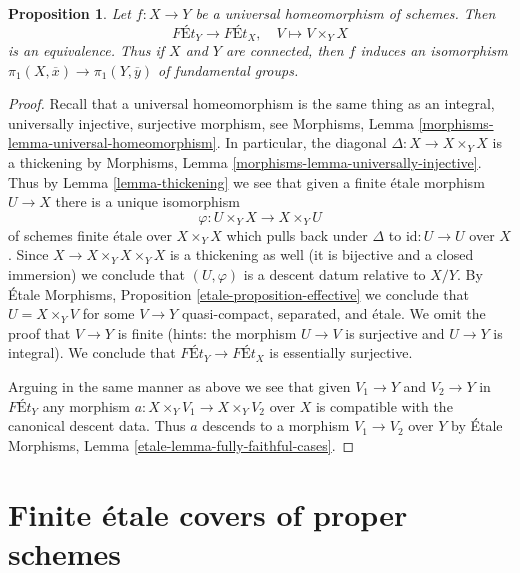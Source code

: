 \documentclass{stacks-project}
\theoremstyle{plain}
\newtheorem{proposition}[subsection]{Proposition}
\theoremstyle{definition}
\theoremstyle{remark}
\numberwithin{equation}{subsection}
\begin{document}
\begin{proposition}
\label{proposition-universal-homeomorphism}
Let $f : X \to Y$ be a universal homeomorphism of schemes. Then
$$
\textit{F\'Et}_Y \longrightarrow \textit{F\'Et}_X,\quad
V \longmapsto V \times_Y X
$$
is an equivalence. Thus if $X$ and $Y$ are connected, then
$f$ induces an isomorphism $\pi_1(X, \overline{x}) \to \pi_1(Y, \overline{y})$
of fundamental groups.
\end{proposition}

\begin{proof}
Recall that a universal homeomorphism is the same thing as an
integral, universally injective, surjective morphism, see
Morphisms, Lemma \ref{morphisms-lemma-universal-homeomorphism}.
In particular, the diagonal $\Delta : X \to X \times_Y X$ is a thickening
by Morphisms, Lemma \ref{morphisms-lemma-universally-injective}.
Thus by Lemma \ref{lemma-thickening}
we see that given a finite \'etale morphism $U \to X$
there is a unique isomorphism
$$
\varphi : U \times_Y X \to X \times_Y U
$$
of schemes finite \'etale over $X \times_Y X$ which pulls back under
$\Delta$ to $\text{id} : U \to U$ over $X$.
Since $X \to X \times_Y X \times_Y X$
is a thickening as well (it is bijective and a closed immersion)
we conclude that $(U, \varphi)$ is a descent datum relative to $X/Y$.
By \'Etale Morphisms, Proposition \ref{etale-proposition-effective}
we conclude that $U = X \times_Y V$ for some $V \to Y$
quasi-compact, separated, and \'etale.
We omit the proof that $V \to Y$ is finite (hints:
the morphism $U \to V$ is surjective and $U \to Y$ is integral).
We conclude that $\textit{F\'Et}_Y \to \textit{F\'Et}_X$
is essentially surjective.

\medskip\noindent
Arguing in the same manner as above we see that given
$V_1 \to Y$ and $V_2 \to Y$ in $\textit{F\'Et}_Y$ any
morphism $a : X \times_Y V_1 \to X \times_Y V_2$ over $X$
is compatible with the canonical descent data. Thus $a$
descends to a morphism $V_1 \to V_2$ over $Y$ by
\'Etale Morphisms, Lemma \ref{etale-lemma-fully-faithful-cases}.
\end{proof}










\section{Finite \'etale covers of proper schemes}
\label{section-finite-etale-over-proper}
\end{document}
